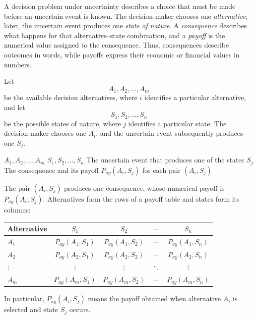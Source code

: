 	A decision problem under uncertainty describes a choice that must be made before an uncertain event is known. The decision-maker chooses one \emph{alternative}; later, the uncertain event produces one \emph{state of nature}. A \emph{consequence} describes what happens for that alternative--state combination, and a \emph{payoff} is the numerical value assigned to the consequence. Thus, consequences describe outcomes in words, while payoffs express their economic or financial values in numbers.
	
	Let
	\[
	A_1,A_2,\ldots,A_m
	\]
	be the available decision alternatives, where $i$ identifies a particular alternative, and let
	\[
	S_1,S_2,\ldots,S_n
	\]
	be the possible states of nature, where $j$ identifies a particular state. The decision-maker chooses one $A_i$, and the uncertain event subsequently produces one $S_j$.
	
	\DecisionElementsTable
	{$A_1,A_2,\ldots,A_m$}
	{$S_1,S_2,\ldots,S_n$}
	{The uncertain event that produces one of the states $S_j$}
	{The consequence and its payoff $P_{ay}(A_i,S_j)$ for each pair $(A_i,S_j)$}
	
	The pair $(A_i,S_j)$ produces one consequence, whose numerical payoff is $P_{ay}(A_i,S_j)$. Alternatives form the rows of a payoff table and states form its columns:
	
	\begin{center}
		\begin{tabular}{lcccc}
			\toprule
			Alternative & $S_1$ & $S_2$ & $\cdots$ & $S_n$ \\
			\midrule
			$A_1$
			& $P_{ay}(A_1,S_1)$
			& $P_{ay}(A_1,S_2)$
			& $\cdots$
			& $P_{ay}(A_1,S_n)$ \\
			$A_2$
			& $P_{ay}(A_2,S_1)$
			& $P_{ay}(A_2,S_2)$
			& $\cdots$
			& $P_{ay}(A_2,S_n)$ \\
			$\vdots$
			& $\vdots$
			& $\vdots$
			& $\ddots$
			& $\vdots$ \\
			$A_m$
			& $P_{ay}(A_m,S_1)$
			& $P_{ay}(A_m,S_2)$
			& $\cdots$
			& $P_{ay}(A_m,S_n)$ \\
			\bottomrule
		\end{tabular}
	\end{center}
	
	In particular, $P_{ay}(A_i,S_j)$ means the payoff obtained when alternative $A_i$ is selected and state $S_j$ occurs.
	
